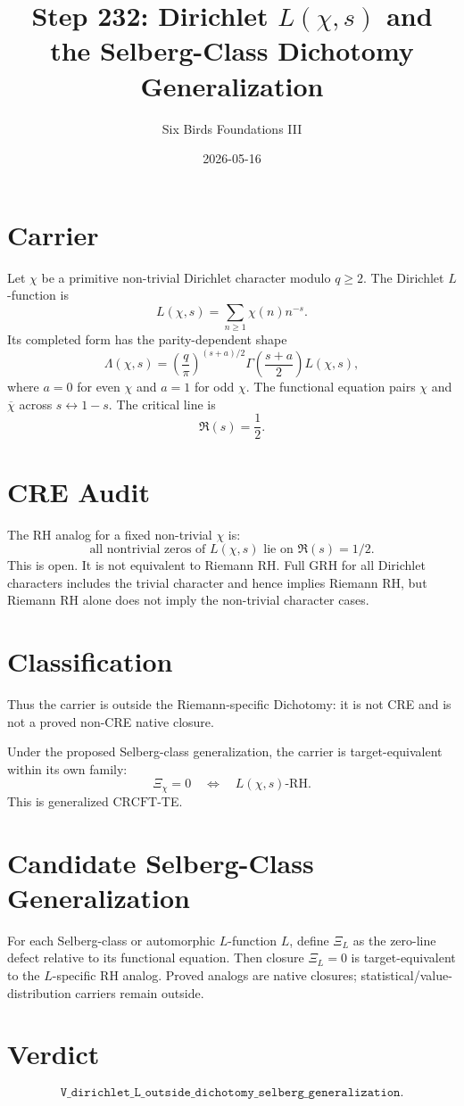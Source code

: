 \documentclass{article}
\title{Step 232: Dirichlet \(L(\chi,s)\) and the Selberg-Class Dichotomy Generalization}
\author{Six Birds Foundations III}
\date{2026-05-16}
\begin{document}
\maketitle

\section{Carrier}

Let \(\chi\) be a primitive non-trivial Dirichlet character modulo \(q\ge 2\). The Dirichlet \(L\)-function is
\[
  L(\chi,s)=\sum_{n\ge 1}\chi(n)n^{-s}.
\]
Its completed form has the parity-dependent shape
\[
  \Lambda(\chi,s)
  =
  \left(\frac{q}{\pi}\right)^{(s+a)/2}
  \Gamma\!\left(\frac{s+a}{2}\right)L(\chi,s),
\]
where \(a=0\) for even \(\chi\) and \(a=1\) for odd \(\chi\). The functional equation pairs \(\chi\) and \(\overline{\chi}\) across \(s\leftrightarrow 1-s\). The critical line is
\[
  \Re(s)=\frac12.
\]

\section{CRE Audit}

The RH analog for a fixed non-trivial \(\chi\) is:
\[
  \text{all nontrivial zeros of }L(\chi,s)\text{ lie on }\Re(s)=1/2.
\]
This is open. It is not equivalent to Riemann RH. Full GRH for all Dirichlet characters includes the trivial character and hence implies Riemann RH, but Riemann RH alone does not imply the non-trivial character cases.

\section{Classification}

Thus the carrier is outside the Riemann-specific Dichotomy: it is not CRE and is not a proved non-CRE native closure.

Under the proposed Selberg-class generalization, the carrier is target-equivalent within its own family:
\[
  \Xi_\chi=0
  \quad\Longleftrightarrow\quad
  L(\chi,s)\text{-RH}.
\]
This is generalized \(\mathrm{CRCFT}\)-TE.

\section{Candidate Selberg-Class Generalization}

For each Selberg-class or automorphic \(L\)-function \(L\), define \(\Xi_L\) as the zero-line defect relative to its functional equation. Then closure \(\Xi_L=0\) is target-equivalent to the \(L\)-specific RH analog. Proved analogs are native closures; statistical/value-distribution carriers remain outside.

\section{Verdict}

\[
  \boxed{\texttt{V\_dirichlet\_L\_outside\_dichotomy\_selberg\_generalization}.}
\]
\end{document}
